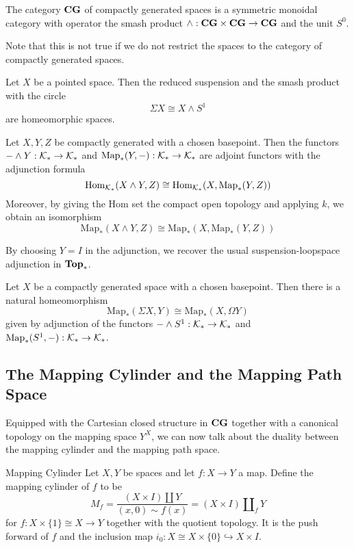 \documentclass[a4paper]{article}
\begin{document}
\begin{thm}{}{} The category $\bold{CG}$ of compactly generated spaces is a symmetric monoidal category with operator the smash product $\wedge:\bold{CG}\times\bold{CG}\to\bold{CG}$ and the unit $S^0$. 
\end{thm}

Note that this is not true if we do not restrict the spaces to the category of compactly generated spaces. 

\begin{lmm}{}{} Let $X$ be a pointed space. Then the reduced suspension and the smash product with the circle $$\Sigma X\cong X\wedge S^1$$ are homeomorphic spaces. 
\end{lmm}

\begin{thm}{}{} Let $X,Y,Z$ be compactly generated with a chosen basepoint. Then the functors $-\wedge Y:\mathcal{K}_\ast\to\mathcal{K}_\ast$ and $\text{Map}_\ast(Y,-):\mathcal{K}_\ast\to\mathcal{K}_\ast$ are adjoint functors with the adjunction formula $$\operatorname{Hom}_{\mathcal{K}_\ast}(X\wedge Y,Z)\cong\operatorname{Hom}_{\mathcal{K}_\ast}(X,\text{Map}_\ast(Y,Z))$$ Moreover, by giving the Hom set the compact open topology and applying $k$, we obtain an isomorphism $$\text{Map}_\ast(X\wedge Y,Z)\cong\text{Map}_\ast(X,\text{Map}_\ast(Y,Z))$$
\end{thm}

By choosing $Y=I$ in the adjunction, we recover the usual suspension-loopspace adjunction in $\bold{Top}_\ast$. 

\begin{crl}{}{} Let $X$ be a compactly generated space with a chosen basepoint. Then there is a natural homeomorphism $$\text{Map}_\ast(\Sigma X,Y)\cong\text{Map}_\ast(X,\Omega Y)$$ given by adjunction of the functors $-\wedge S^1:\mathcal{K}_\ast\to\mathcal{K}_\ast$ and $\text{Map}_\ast(S^1,-):\mathcal{K}_\ast\to\mathcal{K}_\ast$. 
\end{crl}

\subsection{The Mapping Cylinder and the Mapping Path Space}
Equipped with the Cartesian closed structure in $\bold{CG}$ together with a canonical topology on the mapping space $Y^X$, we can now talk about the duality between the mapping cylinder and the mapping path space. 

\begin{defn}{Mapping Cylinder}{} Let $X,Y$ be spaces and let $f:X\to Y$ a map. Define the mapping cylinder of $f$ to be $$M_f=\frac{(X\times I)\amalg Y}{(x,0)\sim f(x)}=(X\times I)\amalg_fY$$ for $f:X\times\{1\}\cong X\to Y$ together with the quotient topology. It is the push forward of $f$ and the inclusion map $i_0:X\cong X\times\{0\}\hookrightarrow X\times I$. 
\end{defn}
\end{document}
